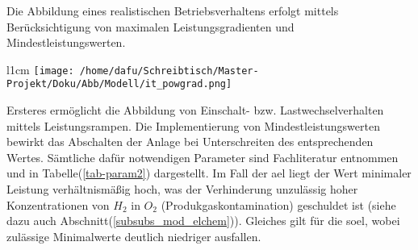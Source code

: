 \documentclass[onecolumn,10pt,titlepage]{article}
\begin{document}
Die Abbildung eines realistischen Betriebsverhaltens erfolgt mittels Berücksichtigung von maximalen Leistungsgradienten und Mindestleistungswerten.
\begin{wrapfigure}{l}{1cm}
	\texttt{[image: /home/dafu/Schreibtisch/Master-Projekt/Doku/Abb/Modell/it\_powgrad.png]}
\end{wrapfigure} Ersteres ermöglicht die Abbildung von Einschalt- bzw. Lastwechselverhalten mittels Leistungsrampen. Die Implementierung von Mindestleistungswerten bewirkt das Abschalten der Anlage bei Unterschreiten des entsprechenden Wertes. Sämtliche dafür notwendigen Parameter sind Fachliteratur \cite{Buttler.2018} entnommen und in Tabelle(\ref{tab-param2}) dargestellt.  Im Fall der \gls{ael} liegt der Wert minimaler Leistung verhältnismäßig hoch, was der Verhinderung unzulässig hoher Konzentrationen von $H_2$ in $O_2$ (Produkgaskontamination) \cite{Trinke2018} geschuldet ist (siehe dazu auch Abschnitt(\ref{subsubs_mod_elchem})). Gleiches gilt für die \gls{soel}, wobei zulässige Minimalwerte deutlich niedriger ausfallen.
\newline

%

\end{document}

